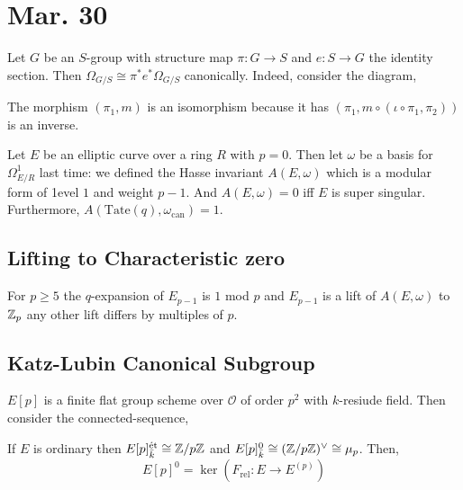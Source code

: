 \documentclass[12pt]{article}
\begin{document}
\newcommand{\can}{\mathrm{can}}
\newcommand{\cO}{\mathcal{O}}

\section{Mar. 30}

\begin{rmk}
Let $G$ be an $S$-group with structure map $\pi : G \to S$ and $e : S \to G$ the identity section. Then $\Omega_{G/S} \cong \pi^* e^* \Omega_{G/S}$ canonically. Indeed, consider the diagram,
\begin{center}
\end{center}
The morphism $(\pi_1, m)$ is an isomorphism because it has $(\pi_1, m \circ (\iota \circ \pi_1, \pi_2))$ is an inverse. 
\end{rmk}

Let $E$ be an elliptic curve over a ring $R$ with $p = 0$. Then let $\omega$ be a basis for $\Omega^1_{E/R}$ last time: we defined the Hasse invariant $A(E, \omega)$ which is a modular form of 1evel $1$ and weight $p-1$. And $A(E,\omega) = 0$ iff $E$ is super singular. Furthermore, $A(\mathrm{Tate}(q), \omega_{\can}) = 1$. 

\subsection{Lifting to Characteristic zero}

For $p \ge 5$ the $q$-expansion of $E_{p-1}$ is $1$ mod $p$ and $E_{p-1}$ is a lift of $A(E, \omega)$ to $\mathbb{Z}_p$ any other lift differs by multiples of $p$. 


\subsection{Katz-Lubin Canonical Subgroup}

$E[p]$ is a finite flat group scheme over $\cO$ of order $p^2$ with $k$-resiude field.  Then consider the connected-\etale sequence,
\begin{center}
\end{center}
If $E$ is ordinary then $E[p]^{\text{\'{e}t}}_{\bar{k}} \cong \mathbb{Z} / p \mathbb{Z}$ and $E[p]^0_{\bar{k}} \cong (\mathbb{Z} / p \mathbb{Z})^\vee \cong \mu_p$. Then,
\[ E[p]^0 = \ker{(F_{\text{rel}} : E \to E^{(p)})} \] 
\end{document}
